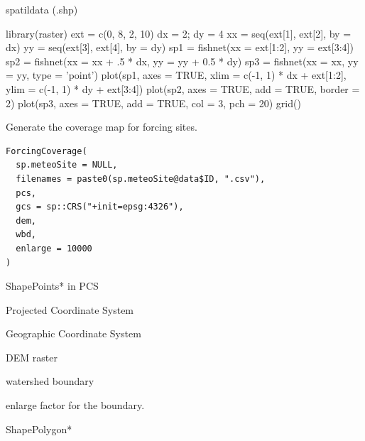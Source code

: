 \documentclass[a4paper]{book}
\begin{document}
%
\begin{Value}
spatildata (.shp)
\end{Value}
%
\begin{Examples}
\begin{ExampleCode}
library(raster)
ext = c(0, 8, 2, 10)
dx = 2; dy = 4
xx = seq(ext[1], ext[2], by = dx)
yy = seq(ext[3], ext[4], by = dy)
sp1 = fishnet(xx = ext[1:2], yy = ext[3:4])
sp2 = fishnet(xx = xx + .5 * dx, yy = yy + 0.5 * dy)
sp3 = fishnet(xx = xx, yy = yy, type = 'point')
plot(sp1, axes = TRUE, xlim = c(-1, 1) * dx + ext[1:2], ylim = c(-1, 1) * dy + ext[3:4])
plot(sp2, axes = TRUE, add = TRUE, border = 2)
plot(sp3, axes = TRUE, add = TRUE, col = 3, pch = 20)
grid()
\end{ExampleCode}
\end{Examples}
%
\begin{Description}\relax
Generate the coverage map for forcing sites.
\end{Description}
%
\begin{Usage}
\begin{verbatim}
ForcingCoverage(
  sp.meteoSite = NULL,
  filenames = paste0(sp.meteoSite@data$ID, ".csv"),
  pcs,
  gcs = sp::CRS("+init=epsg:4326"),
  dem,
  wbd,
  enlarge = 10000
)
\end{verbatim}
\end{Usage}
%
\begin{Arguments}
\begin{ldescription}
\item[\code{sp.meteoSite}] ShapePoints* in PCS

\item[\code{pcs}] Projected Coordinate System

\item[\code{gcs}] Geographic Coordinate System

\item[\code{dem}] DEM raster

\item[\code{wbd}] watershed boundary

\item[\code{enlarge}] enlarge factor for the boundary.
\end{ldescription}
\end{Arguments}
%
\begin{Value}
ShapePolygon*
\end{Value}
\end{document}
